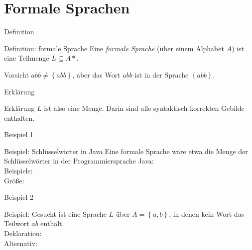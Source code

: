 \section{Formale Sprachen}
\begin{frame}{Definition}
    \begin{block}{Definition: formale Sprache}
        Eine \emph{formale Sprache} (über einem Alphabet $A$) ist eine Teilmenge
$L \subseteq A*$.
    \end{block}
    \begin{alertblock}{Vorsicht}
        $abb \neq \left\{ abb\right\}$, aber das Wort $abb$ ist in der Sprache $\left\{ abb\right\}$.
    \end{alertblock}
\end{frame}
\begin{frame}{Erklärung}
    \begin{block}{Erklärung}
        $L$ ist also eine Menge. Darin sind alle syntaktisch korrekten Gebilde enthalten.
    \end{block}
\end{frame}
\begin{frame}{Beispiel 1}
    \begin{block}{Beispiel: Schlüsselwörter in Java}
        Eine formale Sprache wäre etwa die Menge der Schlüsselwörter in der Programmiersprache Java:\\
        \pause
        Beispiele: \\
        \pause
        Größe: 
    \end{block}
\end{frame}
\begin{frame}{Beispiel 2}
    \begin{block}{Beispiel: }
        Gesucht ist eine Sprache $L$ über $A = \left\{ a, b\right\}$, in denen kein Wort das Teilwort $ab$ enthält.\\
        Deklaration: \\
        \pause
        Alternativ: 
        \pause
    \end{block}
\end{frame}

